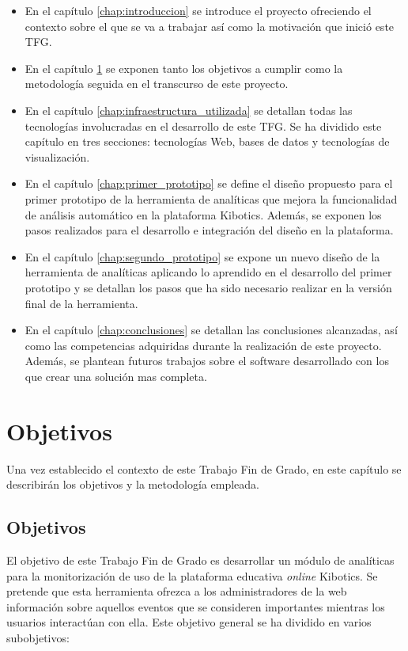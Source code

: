 \documentclass[a4paper, 12pt]{book}
\begin{document}
	\begin{itemize}
		\item En el capítulo \ref{chap:introduccion} se introduce el proyecto ofreciendo el contexto sobre el que se va a trabajar así como la motivación que inició este TFG.
		
		\item En el capítulo \ref{chap:objetivos} se exponen tanto los objetivos a cumplir como la metodología seguida en el transcurso de este proyecto. 
		
		\item En el capítulo \ref{chap:infraestructura_utilizada} se detallan todas las tecnologías involucradas en el desarrollo de este TFG. Se ha dividido este capítulo en tres secciones: tecnologías Web, bases de datos y tecnologías de visualización. 
		
		\item En el capítulo \ref{chap:primer_prototipo} se define el diseño propuesto para el primer prototipo de la herramienta de analíticas que mejora la funcionalidad de análisis automático en la plataforma Kibotics. Además, se exponen los pasos realizados para el desarrollo e integración del diseño en la plataforma.
		
		\item En el capítulo \ref{chap:segundo_prototipo} se expone un nuevo diseño de la herramienta de analíticas aplicando lo aprendido en el desarrollo del primer prototipo y se detallan los pasos que ha sido necesario realizar en la versión final de la herramienta.
		
		\item En el capítulo \ref{chap:conclusiones} se detallan las conclusiones alcanzadas, así como las competencias adquiridas durante la realización de este proyecto. Además, se plantean futuros trabajos sobre el software desarrollado con los que crear una solución mas completa.
		
	\end{itemize}
		
		
		
	\cleardoublepage 
	\chapter{Objetivos} 
	\label{chap:objetivos} 
		Una vez establecido el contexto de este Trabajo Fin de Grado, en este capítulo se describirán los objetivos y la metodología empleada.

	\section{Objetivos}
	\label{sec:objetivos}
		El objetivo de este Trabajo Fin de Grado es desarrollar un módulo de analíticas para la monitorización de uso de la plataforma educativa \textit{online} Kibotics. Se pretende que esta herramienta ofrezca a los administradores de la web información sobre aquellos eventos que se consideren importantes mientras los usuarios interactúan con ella. Este objetivo general se ha dividido en varios subobjetivos:
		
\end{document}
